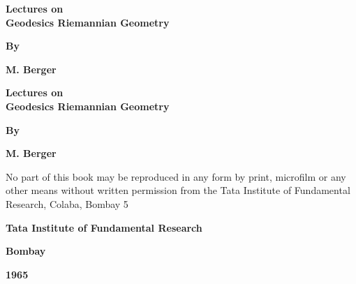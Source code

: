 \thispagestyle{empty}
\vfill


\begin{center}
{\Large\bf Lectures on}\\[5pt] 
{\Large\bf Geodesics Riemannian Geometry}
\medskip

{\bf By}
\medskip

{\large\bf M. Berger}
\end{center}
\vfill 

\newpage

\thispagestyle{empty}
\begin{center}
{\Large\bf Lectures on}\\[5pt] 
{\Large\bf Geodesics Riemannian Geometry}
\vskip 1cm

{\bf By}
\medskip

{\large\bf M. Berger}
\vfill



\parbox{0.7\textwidth}{No part of this book may be reproduced in any 
form by print, microfilm or any other means without written permission
from the Tata Institute of Fundamental Research, Colaba, Bombay 5       }
\vfill 



{\bf Tata Institute of Fundamental Research}

{\bf Bombay}

{\bf 1965}
\end{center}





